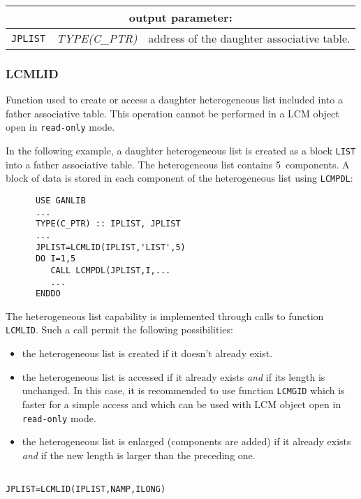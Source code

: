 \vskip 0.8cm

\noindent
\begin{tabular}{|p{1.5cm}|p{3cm}|p{10cm}|}
\hline
\multicolumn{3}{|c|}{\bf output parameter:} \\
\hline
{\tt JPLIST} & {\it TYPE(C\_PTR)} & address of the daughter associative table. \\
\hline
\end{tabular}

\subsubsection{LCMLID}

Function used to create or access a daughter heterogeneous list included into a father associative table. This operation cannot be
performed in a LCM object open in {\tt read-only} mode.

\vskip 0.2cm

In the following example, a daughter heterogeneous list is created as a block {\tt LIST}
into a father associative table. The heterogeneous list contains 5~components. A block of data
is stored in each component of the heterogeneous list using {\tt LCMPDL}:

\begin{verbatim}
      USE GANLIB
      ...
      TYPE(C_PTR) :: IPLIST, JPLIST
      ...
      JPLIST=LCMLID(IPLIST,'LIST',5)
      DO I=1,5
         CALL LCMPDL(JPLIST,I,...
         ...
      ENDDO
\end{verbatim}

\vskip 0.2cm

The heterogeneous list capability is implemented through calls to function {\tt LCMLID}. Such a
call permit the following possibilities:
\begin{itemize}
\item the heterogeneous list is created if it doesn't already exist.
\item the heterogeneous list is accessed if it already exists {\sl and} if its length is unchanged. In this case,
it is recommended to use function {\tt LCMGID} which is faster for a simple access and which can be used
with LCM object open in {\tt read-only} mode.
\item the heterogeneous list is enlarged (components are added) if it already exists {\sl and} if the new length is larger than the preceding one.
\end{itemize}

\begin{verbatim}

JPLIST=LCMLID(IPLIST,NAMP,ILONG)
\end{verbatim}

